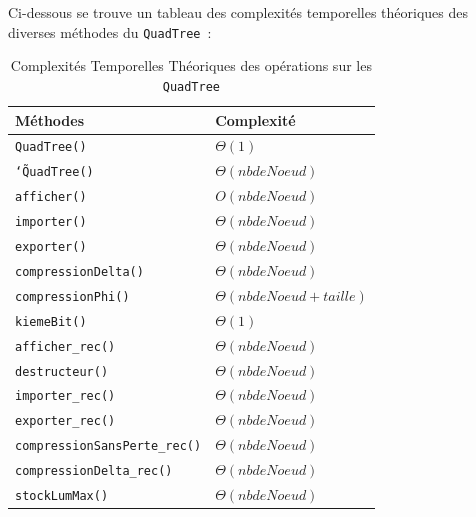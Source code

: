 \documentclass{article}
\newcommand{\info}{\texttt}
\newcommand{\qt}{\info{QuadTree}}
\begin{document}
	Ci-dessous se trouve un tableau des complexités temporelles théoriques des diverses méthodes du \qt\ :
	\begin{table}[H]
		\centering
		\label{ComplexiteTheo}
		\begin{tabular}{|l|l|}
			\hline
			\rowcolor[HTML]{C0C0C0} 
			{\color[HTML]{333333} \textbf{Méthodes}} & \textbf{Complexité} \\ \hline
			\info{QuadTree()}                                 &  $\Theta(1)$                   \\ \hline
			\info{\char`\~QuadTree()}                                &  $\Theta(nb de Noeud)$                   \\ \hline
			\info{afficher()}                                &  $O(nb de Noeud)$                   \\ \hline
			\info{importer()}                                 &  $\Theta(nb de Noeud)$                   \\ \hline
			\info{exporter()}                               &  $\Theta(nb de Noeud)$                   \\ \hline
			\info{compressionDelta()}                                &  $\Theta(nb de Noeud)$                   \\ \hline
			\info{compressionPhi()}                                 &  $\Theta(nb de Noeud + taille)$                   \\ \hline
			\info{kiemeBit()}                                 &  $\Theta(1)$                   \\ \hline
			\info{afficher\_rec()}                                 &  $\Theta(nb de Noeud)$                   \\ \hline
			\info{destructeur()}                                 &  $\Theta(nb de Noeud)$                   \\ \hline
			\info{importer\_rec()}                                 &  $\Theta(nb de Noeud)$                   \\ \hline
			\info{exporter\_rec()}                                 &  $\Theta(nb de Noeud)$                   \\ \hline
			\info{compressionSansPerte\_rec()}                                 &  $\Theta(nb de Noeud)$                   \\ \hline
			\info{compressionDelta\_rec()}                                 &  $\Theta(nb de Noeud)$                   \\ \hline
			\info{stockLumMax()}                                 &  $\Theta(nb de Noeud)$                   \\ \hline
		\end{tabular}
		\caption{Complexités Temporelles Théoriques des opérations sur les \qt}
	\end{table}
	
\end{document}
